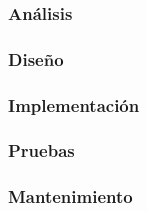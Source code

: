 \documentclass[./introduccion.tex]{subfiles}
\begin{document}
\subsubsection{Análisis}

\subsubsection{Diseño}

\subsubsection{Implementación}

\subsubsection{Pruebas}

\subsubsection{Mantenimiento}
\end{document}
